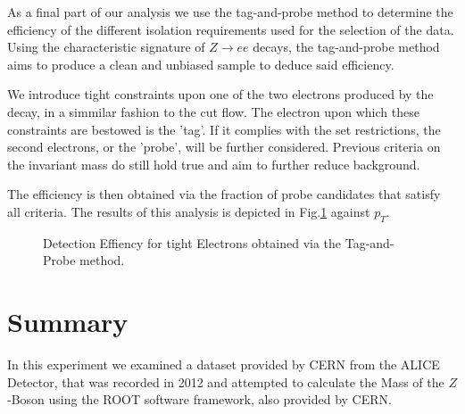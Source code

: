 \documentclass[11 pt]{article}
\begin{document}
As a final part of our analysis we use the tag-and-probe method to determine the efficiency of the different isolation requirements used for the selection of the data. Using the characteristic signature of $ Z \rightarrow ee$ decays, the tag-and-probe method aims to produce a clean and unbiased sample to deduce said efficiency.

We introduce tight constraints upon one of the two electrons produced by the decay, in a simmilar fashion to the cut flow. The electron upon which these constraints are bestowed is the 'tag'. If it complies with the set restrictions, the second electrons, or the 'probe', will be further considered. Previous criteria on the invariant mass do still hold true and aim to further reduce background.

The efficiency is then obtained via the fraction of probe candidates that satisfy all criteria. The results of this analysis is depicted in Fig.\ref{fig:detection_Efficiency} against $p_T$.

\begin{figure}[htbp]
    \centering

        \centering
    \caption{Detection Effiency for tight Electrons obtained via the Tag-and-Probe method.}
    \label{fig:detection_Efficiency}
\end{figure}

\section{Summary}
In this experiment we examined a dataset provided by CERN from the ALICE Detector, that was recorded in 2012 and attempted to calculate the Mass of the $Z$-Boson using the ROOT software framework, also provided by CERN.
\end{document}
